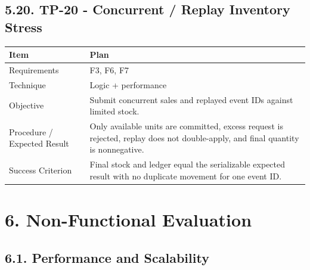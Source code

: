 \subsection{5.20. TP-20 - Concurrent / Replay Inventory Stress}\label{tp-20---concurrent-replay-inventory-stress}

{\def\LTcaptype{none} %
\begin{longtable}[]{|
  >{\raggedright\arraybackslash}m{}|
  >{\raggedright\arraybackslash}m{}|}
\hline
\begin{minipage}[c]{\linewidth}\raggedright
\textbf{Item}
\end{minipage} & \begin{minipage}[c]{\linewidth}\raggedright
\textbf{Plan}
\end{minipage} \\
\hline
\endhead

\endlastfoot
Requirements & F3, F6, F7 \\ \hline
Technique & Logic + performance \\ \hline
Objective & Submit concurrent sales and replayed event IDs against limited stock. \\ \hline
Procedure / Expected Result & Only available units are committed, excess request is rejected, replay does not double-apply, and final quantity is nonnegative. \\ \hline
Success Criterion & Final stock and ledger equal the serializable expected result with no duplicate movement for one event ID. \\ \hline
\end{longtable}
}

\clearpage
\section{6. Non-Functional Evaluation}\label{non-functional-evaluation}

\subsection{6.1. Performance and Scalability}\label{performance-and-scalability}

